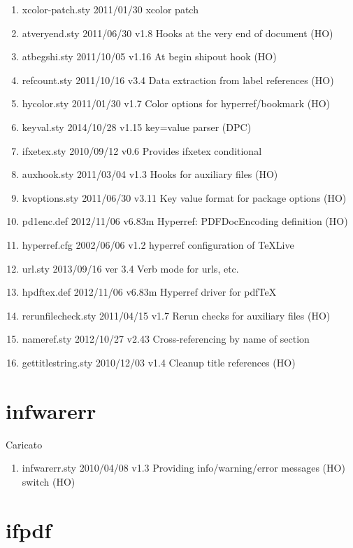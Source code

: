 \begin{enumerate}
\item 	xcolor-patch.sty    2011/01/30 xcolor patch
\item 	atveryend.sty    2011/06/30 v1.8 Hooks at the very end of document (HO)
\item 	atbegshi.sty    2011/10/05 v1.16 At begin shipout hook (HO)
\item 	refcount.sty    2011/10/16 v3.4 Data extraction from label references (HO)
\item 	hycolor.sty    2011/01/30 v1.7 Color options for hyperref/bookmark (HO)
\item 	keyval.sty    2014/10/28 v1.15 key=value parser (DPC)
\item 	ifxetex.sty    2010/09/12 v0.6 Provides ifxetex conditional
\item 	auxhook.sty    2011/03/04 v1.3 Hooks for auxiliary files (HO)
\item 	kvoptions.sty    2011/06/30 v3.11 Key value format for package options (HO)
\item 	pd1enc.def    2012/11/06 v6.83m Hyperref: PDFDocEncoding definition (HO)
\item 	hyperref.cfg    2002/06/06 v1.2 hyperref configuration of TeXLive
\item 	url.sty    2013/09/16  ver 3.4  Verb mode for urls, etc.
\item 	hpdftex.def    2012/11/06 v6.83m Hyperref driver for pdfTeX
\item 	rerunfilecheck.sty    2011/04/15 v1.7 Rerun checks for auxiliary files (HO)
\item 	nameref.sty    2012/10/27 v2.43 Cross-referencing by name of section
\item 	gettitlestring.sty    2010/12/03 v1.4 Cleanup title references (HO)
\end{enumerate} 
\section{infwarerr}  


Caricato 
\begin{enumerate}
	\item infwarerr.sty 2010/04/08 v1.3 Providing info/warning/error messages (HO) switch (HO)
\end{enumerate} 
\section{ifpdf}  


